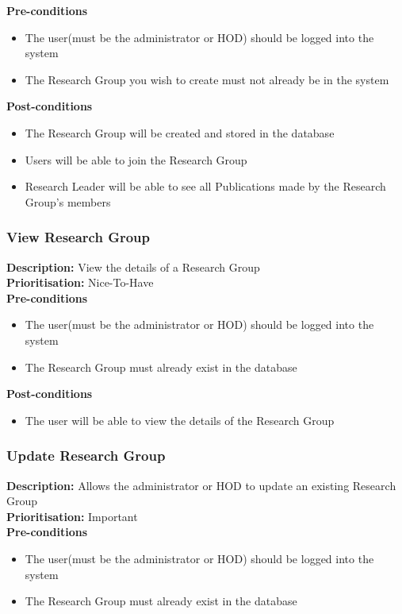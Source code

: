 \documentclass[a4paper]{article}
\begin{document}
	\textbf{Pre-conditions}
	 \begin{itemize}
		\item The user(must be the administrator or HOD) should be logged into the system
		\item The Research Group you wish to create must not already be in the system
	\end{itemize}
	
	\textbf{Post-conditions}
	 \begin{itemize}
		\item The Research Group will be created and stored in the database
		\item Users will be able to join the Research Group
		\item Research Leader will be able to see all Publications made by the Research Group's members
	\end{itemize}
	
	\subsubsection{View Research Group}
	\textbf{Description:} View the details of a Research Group \\
	\textbf{Prioritisation:} Nice-To-Have\\
	
	\textbf{Pre-conditions}
	 \begin{itemize}
		\item The user(must be the administrator or HOD) should be logged into the system
		\item The Research Group must already exist in the database
    \end{itemize}
	
	\textbf{Post-conditions}
	 \begin{itemize}
		\item The user will be able to view the details of the Research Group
	\end{itemize}
	
	\subsubsection{Update Research Group}
	\textbf{Description:} Allows the administrator or HOD to update an existing Research Group\\
	\textbf{Prioritisation:} Important\\
	
	\textbf{Pre-conditions}
	 \begin{itemize}
		\item The user(must be the administrator or HOD) should be logged into the system
		\item The Research Group must already exist in the database
	\end{itemize}
	
\end{document}
